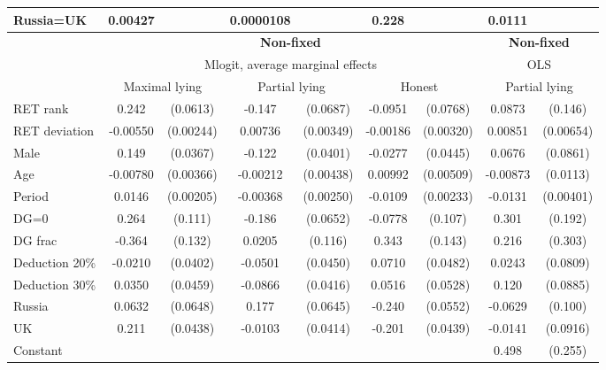 \begin{tabular}{l|cccccc|cc}
Russia=UK       &  0.00427         &         &0.0000108         &         &    0.228         &         &   0.0111         &         \\
\hline\hline
&\multicolumn{6}{c|}{\bf Non-fixed}&\multicolumn{2}{c}{\bf Non-fixed}\\ &\multicolumn{6}{c|}{Mlogit, average marginal effects }&\multicolumn{2}{c}{OLS}\\
                &\multicolumn{2}{c}{Maximal lying}&\multicolumn{2}{c}{Partial lying}&\multicolumn{2}{c|}{Honest}  &\multicolumn{2}{c}{Partial lying}\\
\hline
RET rank        &    0.242\sym{***}& (0.0613)&   -0.147\sym{**} & (0.0687)&  -0.0951         & (0.0768)&   0.0873         &  (0.146)\\
RET deviation   & -0.00550\sym{**} &(0.00244)&  0.00736\sym{**} &(0.00349)& -0.00186         &(0.00320)&  0.00851         &(0.00654)\\
Male            &    0.149\sym{***}& (0.0367)&   -0.122\sym{***}& (0.0401)&  -0.0277         & (0.0445)&   0.0676         & (0.0861)\\
Age             & -0.00780\sym{**} &(0.00366)& -0.00212         &(0.00438)&  0.00992\sym{*}  &(0.00509)& -0.00873         & (0.0113)\\
Period          &   0.0146\sym{***}&(0.00205)& -0.00368         &(0.00250)&  -0.0109\sym{***}&(0.00233)&  -0.0131\sym{***}&(0.00401)\\
DG=0          &    0.264\sym{**} &  (0.111)&   -0.186\sym{***}& (0.0652)&  -0.0778         &  (0.107)&    0.301         &  (0.192)\\
DG frac         &   -0.364\sym{***}&  (0.132)&   0.0205         &  (0.116)&    0.343\sym{**} &  (0.143)&    0.216         &  (0.303)\\
Deduction 20\%&  -0.0210         & (0.0402)&  -0.0501         & (0.0450)&   0.0710         & (0.0482)&   0.0243         & (0.0809)\\
Deduction 30\%&   0.0350         & (0.0459)&  -0.0866\sym{**} & (0.0416)&   0.0516         & (0.0528)&    0.120         & (0.0885)\\
Russia        &   0.0632         & (0.0648)&    0.177\sym{***}& (0.0645)&   -0.240\sym{***}& (0.0552)&  -0.0629         &  (0.100)\\
UK            &    0.211\sym{***}& (0.0438)&  -0.0103         & (0.0414)&   -0.201\sym{***}& (0.0439)&  -0.0141         & (0.0916)\\
Constant        &                  &         &                  &         &                  &         &    0.498\sym{*}  &  (0.255)\\

\end{tabular}
